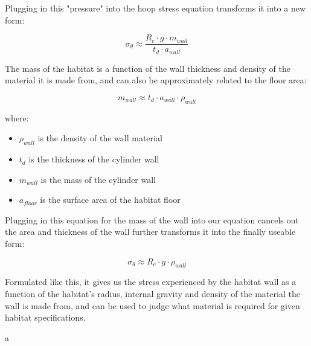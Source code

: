 \documentclass[a4paper]{article}
\begin{document}
	Plugging in this "pressure" into the hoop stress equation transforms it into a new form:
	
	$$ \sigma_\theta \approx \frac{R_c \cdot g \cdot m_{wall}}{t_d \cdot a_{wall}} $$
	
	The mass of the habitat is a function of the wall thickness and density of the material it is made from, and can also be approximately related to the floor area:
	
	$$ m_{wall} \approx t_d \cdot a_{wall} \cdot \rho_{wall}$$
	
	where:
	
	\begin{itemize}
		\item $\rho_{wall}$ is the density of the wall material
		
		\item $t_d$ is the thickness of the cylinder wall
		
		\item $m_{wall}$ is the mass of the cylinder wall
		
		\item $a_{floor}$ is the surface area of the habitat floor
	\end{itemize}
	
	Plugging in this equation for the mass of the wall into our equation cancels out the area and thickness of the wall further transforms it into the finally useable form:
	
	$$ \sigma_\theta \approx R_c \cdot g \cdot \rho_{wall} $$
	
	Formulated like this, it gives us the stress experienced by the habitat wall as a function of the habitat's radius, internal gravity and density of the material the wall is made from, and can be used to judge what material is required for given habitat specifications.
	
	\pagebreak
	
	a
\end{document}
